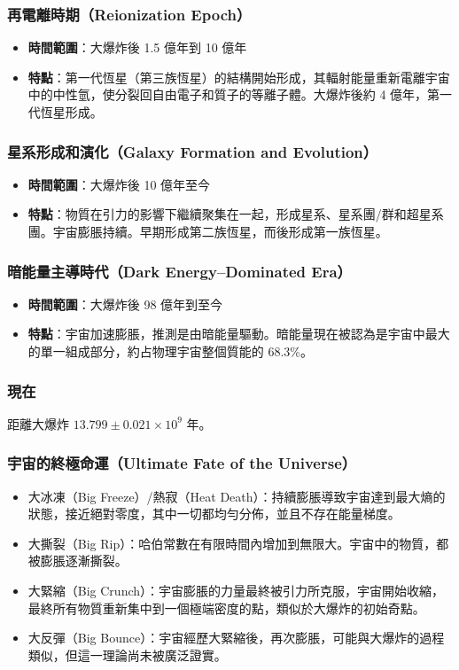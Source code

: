 \documentclass[a4paper,12pt]{report}
\begin{document}
\subsubsection{再電離時期（Reionization Epoch）}
\begin{itemize}
\item \textbf{時間範圍}：大爆炸後 1.5 億年到 10 億年
\item \textbf{特點}：第一代恆星（第三族恆星）的結構開始形成，其輻射能量重新電離宇宙中的中性氫，使分裂回自由電子和質子的等離子體。大爆炸後約 4 億年，第一代恆星形成。
\end{itemize}
\subsubsection{星系形成和演化（Galaxy Formation and Evolution）}
\begin{itemize}
\item \textbf{時間範圍}：大爆炸後 10 億年至今
\item \textbf{特點}：物質在引力的影響下繼續聚集在一起，形成星系、星系團/群和超星系團。宇宙膨脹持續。早期形成第二族恆星，而後形成第一族恆星。
\end{itemize}
\subsubsection{暗能量主導時代（Dark Energy–Dominated Era）}
\begin{itemize}
\item \textbf{時間範圍}：大爆炸後 98 億年到至今
\item \textbf{特點}：宇宙加速膨脹，推測是由暗能量驅動。暗能量現在被認為是宇宙中最大的單一組成部分，約占物理宇宙整個質能的 68.3\%。
\end{itemize}
\subsubsection{現在}
距離大爆炸 $13.799 \pm 0.021 \times 10^9$ 年。
\subsubsection{宇宙的終極命運（Ultimate Fate of the Universe）}
\begin{itemize}
\item 大冰凍（Big Freeze）/熱寂（Heat Death）：持續膨脹導致宇宙達到最大熵的狀態，接近絕對零度，其中一切都均勻分佈，並且不存在能量梯度。
\item 大撕裂（Big Rip）：哈伯常數在有限時間內增加到無限大。宇宙中的物質，都被膨脹逐漸撕裂。
\item 大緊縮（Big Crunch）：宇宙膨脹的力量最終被引力所克服，宇宙開始收縮，最終所有物質重新集中到一個極端密度的點，類似於大爆炸的初始奇點。
\item 大反彈（Big Bounce）：宇宙經歷大緊縮後，再次膨脹，可能與大爆炸的過程類似，但這一理論尚未被廣泛證實。
\end{itemize}
\end{document}
